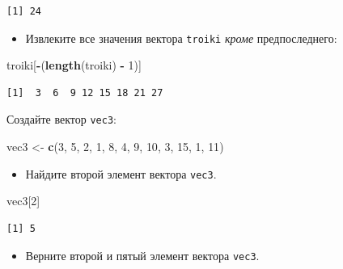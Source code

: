 \documentclass[
]{book}
\newenvironment{Shaded}{\begin{snugshade}}{\end{snugshade}}
\newcommand{\DecValTok}[1]{\textcolor[rgb]{0.00,0.00,0.81}{#1}}
\newcommand{\KeywordTok}[1]{\textcolor[rgb]{0.13,0.29,0.53}{\textbf{#1}}}
\newcommand{\NormalTok}[1]{#1}
\newcommand{\OperatorTok}[1]{\textcolor[rgb]{0.81,0.36,0.00}{\textbf{#1}}}
\newcommand{\StringTok}[1]{\textcolor[rgb]{0.31,0.60,0.02}{#1}}
\providecommand{\tightlist}{%
  \setlength{\itemsep}{0pt}\setlength{\parskip}{0pt}}
\begin{document}
\begin{verbatim}
[1] 24
\end{verbatim}

\begin{itemize}
\tightlist
\item
  Извлеките все значения вектора \texttt{troiki} \emph{кроме} предпоследнего:
\end{itemize}

\begin{Shaded}
\begin{Highlighting}[]
\NormalTok{troiki[}\OperatorTok{-}\NormalTok{(}\KeywordTok{length}\NormalTok{(troiki) }\OperatorTok{-}\StringTok{ }\DecValTok{1}\NormalTok{)]}
\end{Highlighting}
\end{Shaded}

\begin{verbatim}
[1]  3  6  9 12 15 18 21 27
\end{verbatim}

Создайте вектор \texttt{vec3}:

\begin{Shaded}
\begin{Highlighting}[]
\NormalTok{vec3 <-}\StringTok{ }\KeywordTok{c}\NormalTok{(}\DecValTok{3}\NormalTok{, }\DecValTok{5}\NormalTok{, }\DecValTok{2}\NormalTok{, }\DecValTok{1}\NormalTok{, }\DecValTok{8}\NormalTok{, }\DecValTok{4}\NormalTok{, }\DecValTok{9}\NormalTok{, }\DecValTok{10}\NormalTok{, }\DecValTok{3}\NormalTok{, }\DecValTok{15}\NormalTok{, }\DecValTok{1}\NormalTok{, }\DecValTok{11}\NormalTok{)}
\end{Highlighting}
\end{Shaded}

\begin{itemize}
\tightlist
\item
  Найдите второй элемент вектора \texttt{vec3}.
\end{itemize}

\begin{Shaded}
\begin{Highlighting}[]
\NormalTok{vec3[}\DecValTok{2}\NormalTok{]}
\end{Highlighting}
\end{Shaded}

\begin{verbatim}
[1] 5
\end{verbatim}

\begin{itemize}
\tightlist
\item
  Верните второй и пятый элемент вектора \texttt{vec3}.
\end{itemize}
\end{document}
